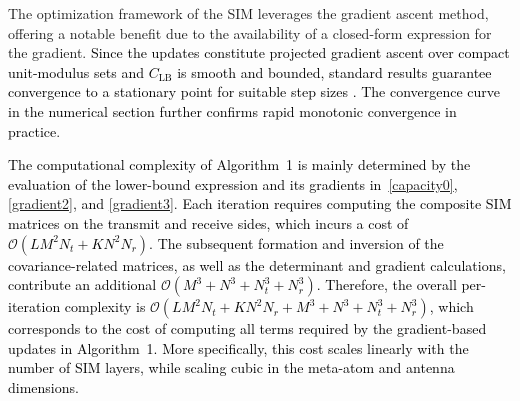 \documentclass[twocolumn,10pt]{IEEEtran}
\begin{document}
	The  optimization framework of the SIM leverages the gradient ascent method, offering a notable benefit due to the availability of a closed-form expression for the gradient. \textcolor{black}{Since the updates constitute projected gradient
	ascent over compact unit-modulus sets and $C_{\mathrm{LB}}$ is smooth and
	bounded, standard results guarantee convergence to a stationary point for
	suitable step sizes \cite{An2023,Papazafeiropoulos2024}. The convergence curve in the numerical section
	further confirms rapid monotonic convergence in practice}.
	 
\textcolor{black}{	The computational complexity of Algorithm~1 is mainly determined by the evaluation of the lower-bound expression and its gradients in~\eqref{capacity0}, \eqref{gradient2}, and \eqref{gradient3}. Each iteration requires computing the composite SIM matrices on the transmit and receive sides, which incurs a cost of $\mathcal{O}(L M^{2}N_{t} + K N^{2}N_{r})$. The subsequent formation and inversion of the covariance-related matrices, as well as the determinant and gradient calculations, contribute an additional $\mathcal{O}(M^{3} + N^{3} + N_{t}^{3} + N_{r}^{3})$. Therefore, the overall per-iteration complexity is $\mathcal{O}(L M^{2}N_{t} + K N^{2}N_{r} + M^{3} + N^{3} + N_{t}^{3} + N_{r}^{3})$, which corresponds to the cost of computing all terms required by the gradient-based updates in Algorithm~1.} \textcolor{black}{More specifically, this cost scales linearly with the number of SIM layers, while
		scaling cubic in the meta-atom and antenna dimensions.}
	
	
	
	
	
	
	
	
	
\end{document}
